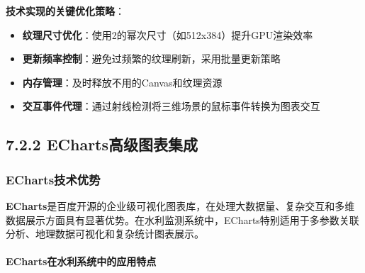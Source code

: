 \begin{Shaded}
\begin{Highlighting}[]
    \OperatorTok{,}
        \OperatorTok{=} \OperatorTok{;}
 \OperatorTok{=}\OperatorTok{;}
\NormalTok{(}\NormalTok{)}\OperatorTok{;} 
        \OperatorTok{;}
\NormalTok{    \}}
\NormalTok{\}}
\end{Highlighting}
\end{Shaded}

\textbf{技术实现的关键优化策略}：

\begin{itemize}
\tightlist
\item
  \textbf{纹理尺寸优化}：使用2的幂次尺寸（如512x384）提升GPU渲染效率
\item
  \textbf{更新频率控制}：避免过频繁的纹理刷新，采用批量更新策略
\item
  \textbf{内存管理}：及时释放不用的Canvas和纹理资源
\item
  \textbf{交互事件代理}：通过射线检测将三维场景的鼠标事件转换为图表交互
\end{itemize}

\subsection{7.2.2 ECharts高级图表集成}\label{echartsux9ad8ux7ea7ux56feux8868ux96c6ux6210}

\subsubsection{ECharts技术优势}\label{echartsux6280ux672fux4f18ux52bf}

\textbf{ECharts}是百度开源的企业级可视化图表库，在处理大数据量、复杂交互和多维数据展示方面具有显著优势。在水利监测系统中，ECharts特别适用于多参数关联分析、地理数据可视化和复杂统计图表展示。

\paragraph{ECharts在水利系统中的应用特点}\label{echartsux5728ux6c34ux5229ux7cfbux7edfux4e2dux7684ux5e94ux7528ux7279ux70b9}

